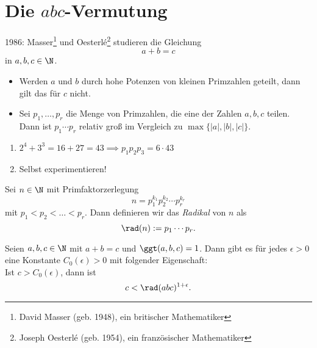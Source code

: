 \chapter{Die $abc$-Vermutung}

1986: Masser\footnote{David Masser (geb. 1948), ein britischer Mathematiker} und Oesterlé\footnote{Joseph Oesterlé (geb. 1954), ein französischer Mathematiker} studieren die Gleichung
\[ a+b=c \]
in $a,b,c \in \N$.

\begin{obs*}
	\begin{itemize}
		\item Werden $a$ und $b$ durch hohe Potenzen von kleinen Primzahlen geteilt, dann gilt das für $c$ nicht.
		\item Sei $p_1,\dotsc,p_r$ die Menge von Primzahlen, die eine der Zahlen $a,b,c$ teilen. Dann ist $p_1 \dotsm p_r$ relativ groß im Vergleich zu $\max\{|a|,|b|,|c|\}$.
	\end{itemize}
\end{obs*}

\begin{exmp*}
	\begin{enumerate}[label={\roman*})]
		\item $2^4+3^3 = 16+27=43 \implies p_1p_2p_3 = 6 \cdot 43$
		\item Selbst experimentieren!
	\end{enumerate}
\end{exmp*}

\begin{defn*}[Radikal] 
	Sei $n \in \N$ mit Primfaktorzerlegung
	\[ n = p_1^{k_1} p_2^{k_2} \dotsm p_r^{k_r} \]
	mit $p_1 < p_2 < \dots < p_r$. Dann definieren wir das \emph{Radikal} von $n$ als 
	\[ \rad(n):= p_1 \dotsm p_r. \]
\end{defn*}

\begin{conj*}
	Seien $a,b,c \in \N$ mit $a+b=c$ und $\ggt(a,b,c)=1$. Dann gibt es für jedes $\epsilon > 0$ eine Konstante $C_0(\epsilon) > 0$ mit folgender Eigenschaft:\\
	Ist $c > C_0(\epsilon)$, dann ist 
	$$c < \rad(abc)^{1+\epsilon}.$$
\end{conj*}